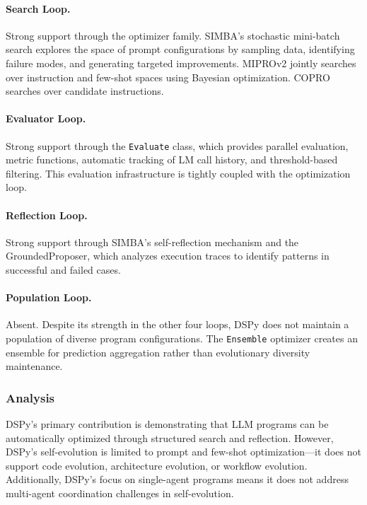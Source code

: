 \paragraph{Search Loop.}
Strong support through the optimizer family. SIMBA's stochastic mini-batch search explores the space of prompt configurations by sampling data, identifying failure modes, and generating targeted improvements. MIPROv2 jointly searches over instruction and few-shot spaces using Bayesian optimization. COPRO searches over candidate instructions.

\paragraph{Evaluator Loop.}
Strong support through the \texttt{Evaluate} class, which provides parallel evaluation, metric functions, automatic tracking of LM call history, and threshold-based filtering. This evaluation infrastructure is tightly coupled with the optimization loop.

\paragraph{Reflection Loop.}
Strong support through SIMBA's self-reflection mechanism and the GroundedProposer, which analyzes execution traces to identify patterns in successful and failed cases.

\paragraph{Population Loop.}
Absent. Despite its strength in the other four loops, DSPy does not maintain a population of diverse program configurations. The \texttt{Ensemble} optimizer creates an ensemble for prediction aggregation rather than evolutionary diversity maintenance.

\subsubsection{Analysis}

DSPy's primary contribution is demonstrating that LLM programs can be automatically optimized through structured search and reflection. However, DSPy's self-evolution is limited to prompt and few-shot optimization---it does not support code evolution, architecture evolution, or workflow evolution. Additionally, DSPy's focus on single-agent programs means it does not address multi-agent coordination challenges in self-evolution.

